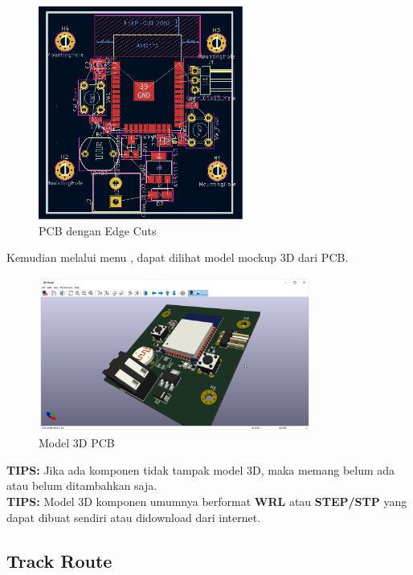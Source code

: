\documentclass[12pt]{book}
\begin{document}
	\begin{figure}[!ht]
		\centering
		\includegraphics[width=0.6\textwidth]{images/pcb/pcb_10}
		\caption{PCB dengan Edge Cuts}
	\end{figure}

	Kemudian melalui menu , dapat dilihat model mockup 3D dari PCB.

	\begin{figure}[!ht]
		\centering
		\includegraphics[width=0.8\textwidth]{images/pcb/pcb_11}
		\caption{Model 3D PCB}
	\end{figure}

	\textbf{TIPS:} Jika ada komponen tidak tampak model 3D, maka memang belum ada atau belum ditambahkan saja.\\

	\textbf{TIPS:} Model 3D komponen umumnya berformat \textbf{WRL} atau \textbf{STEP/STP} yang dapat dibuat sendiri atau didownload dari internet.

	\newpage
	\subsection{Track Route}
\end{document}
